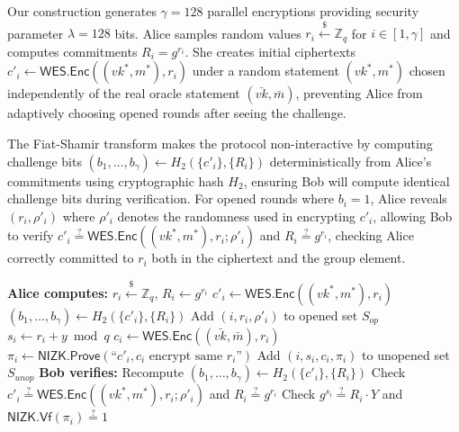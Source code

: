 \documentclass[11pt,a4paper]{article}
\newcommand{\ZZ}{\mathbb{Z}}
\begin{document}
{Our construction generates $\gamma = 128$ parallel encryptions providing security parameter $\lambda = 128$ bits. Alice samples random values $r_i \xleftarrow{\$} \ZZ_q$ for $i \in [1, \gamma]$ and computes commitments $R_i = g^{r_i}$. She creates initial ciphertexts $c'_i \leftarrow \textsf{WES.Enc}((vk^*, m^*), r_i)$ under a random statement $(vk^*, m^*)$ chosen independently of the real oracle statement $(\bar{vk}, \bar{m})$, preventing Alice from adaptively choosing opened rounds after seeing the challenge.

The Fiat-Shamir transform makes the protocol non-interactive by computing challenge bits $(b_1, \ldots, b_\gamma) \leftarrow H_2(\{c'_i\}, \{R_i\})$ deterministically from Alice's commitments using cryptographic hash $H_2$, ensuring Bob will compute identical challenge bits during verification. For opened rounds where $b_i = 1$, Alice reveals $(r_i, \rho'_i)$ where $\rho'_i$ denotes the randomness used in encrypting $c'_i$, allowing Bob to verify $c'_i \stackrel{?}{=} \textsf{WES.Enc}((vk^*, m^*), r_i; \rho'_i)$ and $R_i \stackrel{?}{=} g^{r_i}$, checking Alice correctly committed to $r_i$ both in the ciphertext and the group element.

\begin{algorithm}[H]
\caption{Cut-and-Choose Commitment and Verification}
\begin{algorithmic}[1]
\State \textbf{Alice computes:}
    \State $r_i \xleftarrow{\$} \ZZ_q$, $R_i \leftarrow g^{r_i}$
    \State $c'_i \leftarrow \textsf{WES.Enc}((vk^*, m^*), r_i)$
\EndFor
\State $(b_1, \ldots, b_\gamma) \leftarrow H_2(\{c'_i\}, \{R_i\})$
        \State Add $(i, r_i, \rho'_i)$ to opened set $S_{op}$
    \Else
        \State $s_i \leftarrow r_i + y \bmod q$
        \State $c_i \leftarrow \textsf{WES.Enc}((\bar{vk}, \bar{m}), r_i)$
        \State $\pi_i \leftarrow \textsf{NIZK.Prove}(\text{``}c'_i, c_i \text{ encrypt same } r_i\text{''})$
        \State Add $(i, s_i, c_i, \pi_i)$ to unopened set $S_{unop}$
    \EndIf
\EndFor
\State
\State \textbf{Bob verifies:}
\State Recompute $(b_1, \ldots, b_\gamma) \leftarrow H_2(\{c'_i\}, \{R_i\})$
    \State Check $c'_i \stackrel{?}{=} \textsf{WES.Enc}((vk^*, m^*), r_i; \rho'_i)$ and $R_i \stackrel{?}{=} g^{r_i}$
\EndFor
{}
    \State Check $g^{s_i} \stackrel{?}{=} R_i \cdot Y$ and $\textsf{NIZK.Vf}(\pi_i) \stackrel{?}{=} 1$
\EndFor
\end{algorithmic}
\end{algorithm}

}
\end{document}
